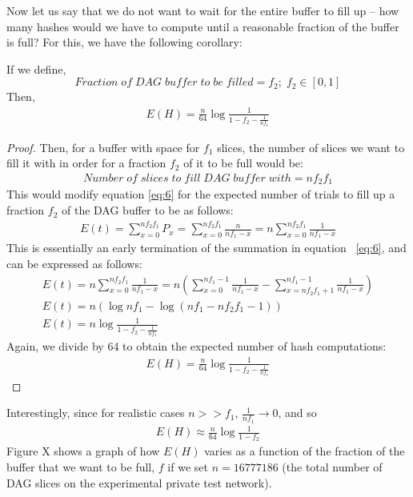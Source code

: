 \documentclass[runningheads]{llncs}
\begin{document}
Now let us say that we do not want to wait for the entire buffer to fill up -- how many hashes would we have to compute until a reasonable fraction of the buffer is full? For this, we have the following corollary:
\begin{corollary}
\label{earlyTermination}
If we define,
  \[Fraction\;of\;DAG\;buffer\;to\;be\;filled = f_2;\;f_2 \in [0,1]\]
  Then,
    \begin{gather}
    E(H) = \frac{n}{64}\log{\frac{1}{1-f_2-\frac{1}{nf_1}}}
  \end{gather}
\end{corollary}
\begin{proof}
Then, for a buffer with space for $f_1$ slices, the number of slices we want to fill it with in order for a fraction $f_2$ of it to be full would be: 
\begin{gather}
  Number\;of\;slices\;to\;fill\;DAG\;buffer\;with = nf_2f_1
\end{gather}
This would modify equation \ref{eq:6} for the expected number of trials to fill up a fraction $f_2$ of the DAG buffer to be as follows:
\begin{gather}
    E(t) = \sum_{x=0}^{nf_2f_1}P_x = \sum_{x=0}^{nf_2f_1}\frac{n}{nf_1-x} = n\sum_{x=0}^{nf_2f_1}\frac{1}{nf_1-x}
\end{gather}
This is essentially an early termination of the summation in equation ~\ref{eq:6}, and can be expressed as follows:
\begin{gather}
    E(t) = n\sum_{x=0}^{nf_2f_1}\frac{1}{nf_1-x} = n(\sum_{x=0}^{nf_1-1}\frac{1}{nf_1-x} - \sum_{x=nf_2f_1+1}^{nf_1-1}\frac{1}{nf_1-x})\\
    E(t) = n(\log{nf_1} - \log{(nf_1-nf_2f_1-1)}) \\
    E(t) = n\log{\frac{1}{1-f_2-\frac{1}{nf_1}}}
\end{gather}
Again, we divide by 64 to obtain the expected number of hash computations:
\begin{gather}
    E(H) = \frac{n}{64}\log{\frac{1}{1-f_2-\frac{1}{nf_1}}}
\end{gather}
\end{proof}
Interestingly, since for realistic cases $n >> f_1$, $\frac{1}{nf_1} \to 0$, and so 
\begin{gather}
E(H) \approx \frac{n}{64}\log{\frac{1}{1-f_2}}
\end{gather}
Figure X shows a graph of how $E(H)$ varies as a function of the fraction of the buffer that we want to be full, $f$ if we set $n = 16777186$ (the total number of DAG slices on the experimental private test network). 
\end{document}
